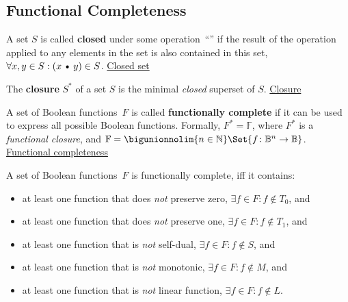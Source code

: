 \documentclass[a4paper,10pt]{article}
\begin{document}
\newpage
\subsection{Functional Completeness}

\begin{terms}
    \item A set $S$ is called \textbf{closed} under some operation~\enquote{\textbullet} if the result of the operation applied to any elements in the set is also contained in this set, \ie $\forall x,y \in S: (x \mathbin{\text{\textbullet}} y) \in S$.
    \hfill\href{https://mathworld.wolfram.com/ClosedSet.html}{Closed set}

    \item The \textbf{closure} $S^{*}$ of a set $S$ is the minimal \emph{closed} superset of $S$.
    \hfill\href{https://mathworld.wolfram.com/SetClosure.html}{Closure}


    \item A set of Boolean functions~$F$ is called \textbf{functionally complete} if it can be used to express all possible Boolean functions.
    Formally, $F^{*} = \mathbb{F}$, where $F^{*}$ is a \emph{functional closure}, and $\mathbb{F} = \bigunionnolim{n \in \Natural} \Set{ f \colon \Bool^{n} \to \Bool }$.
    \hfill\href{https://en.wikipedia.org/wiki/Functional_completeness}{Functional completeness}

    \begin{posttheorem}
        A set of Boolean functions~$F$ is functionally complete, iff it contains:
        \begin{itemize}
            \item at least one function that does \textit{not} preserve zero, \ie $\exists f \in F: f \notin T_0$, and
            \item at least one function that does \textit{not} preserve one, \ie $\exists f \in F: f \notin T_1$, and
            \item at least one function that is \textit{not} self-dual, \ie $\exists f \in F: f \notin S$, and
            \item at least one function that is \textit{not} monotonic, \ie $\exists f \in F: f \notin M$, and
            \item at least one function that is \textit{not} linear function, \ie $\exists f \in F: f \notin L$.
        \end{itemize}
    \end{posttheorem}


\end{terms}
\end{document}
